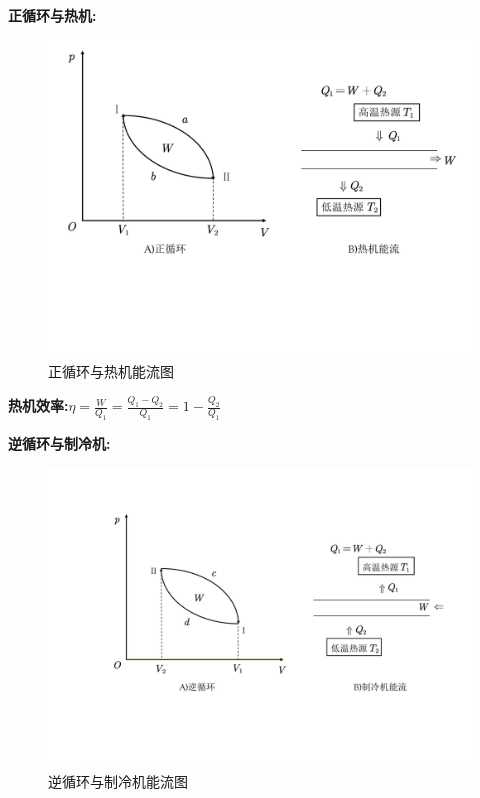 \documentclass[12pt, a4paper, twoside]{ctexbook}
\begin{document}
\textbf{正循环与热机:}
\begin{figure}[H]

    \centering
\includegraphics[scale=0.6]{Figures/pic2.pdf}  
\caption{正循环与热机能流图}
\label{fig2}
   
\end{figure}


\textbf{热机效率:}$\eta=\displaystyle\frac{W}{Q_1}=\frac{Q_1-Q_2}{Q_1}=1-\frac{Q_2}{Q_1}$


\textbf{逆循环与制冷机:}

\begin{figure}[H]

    \centering
\includegraphics[scale=0.6]{Figures/pic3.pdf}  
\caption{逆循环与制冷机能流图}
\label{fig3}
\end{figure}
\end{document}
